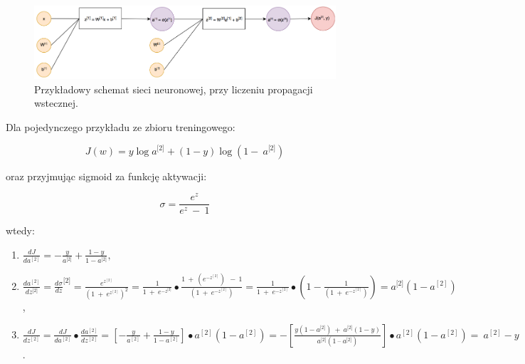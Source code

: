 \begin{figure}[ht]
\centerline{\includegraphics[scale=1]{resources/backprop_fc.png}}
\caption{Przykładowy schemat sieci neuronowej, przy liczeniu propagacji
wstecznej.}
\label{fig:backprop_fc}
\end{figure}

Dla pojedynczego przykładu ze zbioru treningowego:

\[J\left( w \right) = y\log{a^{\lbrack 2\rbrack} + \left( 1 - y \right)\log{(1 - \ a^{\lbrack 2\rbrack})}}\]

oraz przyjmując sigmoid za funkcję aktywacji:

\[\sigma = \frac{e^{z}}{e^{z}\  - \ 1}\]

wtedy:

\begin{enumerate}
\def\labelenumi{\arabic{enumi}.}
\item
  \(\frac{dJ}{da^{\left\lbrack 2 \right\rbrack}} = - \frac{y}{a^{\lbrack 2\rbrack}} + \frac{1 - y}{1 - a^{\lbrack 2\rbrack}},\)
\item
  \(\frac{da^{\left\lbrack 2 \right\rbrack}}{dz^{\lbrack 2\rbrack}} = \frac{d\sigma}{dz}^{\lbrack 2\rbrack} = \frac{e^{z^{\left\lbrack 2 \right\rbrack}}}{\left( 1\  + {\ e}^{z^{\left\lbrack 2 \right\rbrack}} \right)^{2}} = \frac{1}{1\  + {\ e}^{- z^{\lbrack 2\rbrack}}} \bullet \frac{1\  + \ \left( e^{- z^{\left\lbrack 2 \right\rbrack}} \right)\ \  - \ 1}{\left( 1\  + {\ e}^{- z^{\left\lbrack 2 \right\rbrack}} \right)} = \frac{1}{1\  + {\ e}^{- z^{\left\lbrack 2 \right\rbrack}}} \bullet (1 - \frac{1}{\left( 1\  + {\ e}^{- z^{\left\lbrack 2 \right\rbrack}} \right)}) = a^{\lbrack 2\rbrack}(1 - a^{\left\lbrack 2 \right\rbrack})\),
\item
  \(\frac{dJ}{dz^{\left\lbrack 2 \right\rbrack}} = \frac{dJ}{da^{\left\lbrack 2 \right\rbrack}} \bullet \frac{da^{\left\lbrack 2 \right\rbrack}}{dz^{\left\lbrack 2 \right\rbrack}} = \left\lbrack - \frac{y}{a^{\left\lbrack 2 \right\rbrack}} + \frac{1 - y}{1 - a^{\left\lbrack 2 \right\rbrack}} \right\rbrack \bullet a^{\left\lbrack 2 \right\rbrack}\left( 1 - a^{\left\lbrack 2 \right\rbrack} \right) = - \left\lbrack \frac{y\left( 1 - a^{\lbrack 2\rbrack} \right)\  + \ a^{\lbrack 2\rbrack}\left( 1 - y \right)}{a^{\lbrack 2\rbrack}\left( 1\ –\ a^{\lbrack 2\rbrack} \right)} \right\rbrack \bullet a^{\left\lbrack 2 \right\rbrack}\left( 1 - a^{\left\lbrack 2 \right\rbrack} \right) = \ a^{\left\lbrack 2 \right\rbrack} - y\).
\end{enumerate}

